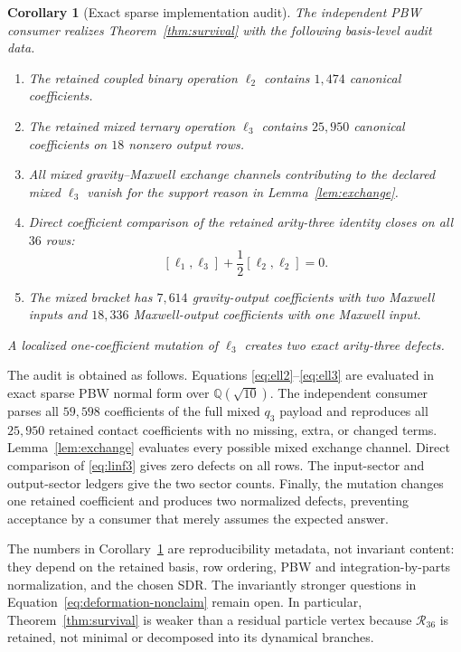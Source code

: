 \documentclass[11pt]{article}
\newtheorem{corollary}[theorem]{Corollary}
\theoremstyle{definition}
\theoremstyle{remark}
\newcommand{\Q}{\mathbb Q}
\newcommand{\cR}{\mathcal R}
\begin{document}
\begin{corollary}[Exact sparse implementation audit]
\label{cor:sparse-audit}
The independent PBW consumer realizes Theorem~\ref{thm:survival} with the
following basis-level audit data.
\begin{enumerate}
\item The retained coupled binary operation $\ell_2$ contains $1{,}474$
canonical coefficients.
\item The retained mixed ternary operation $\ell_3$ contains $25{,}950$
canonical coefficients on $18$ nonzero output rows.
\item All mixed gravity--Maxwell exchange channels contributing to the
declared mixed $\ell_3$ vanish for the support reason in
Lemma~\ref{lem:exchange}.
\item Direct coefficient comparison of the retained arity-three identity
closes on all $36$ rows:
\begin{equation}\label{eq:linf3}
 [\ell_1,\ell_3]+\frac12[\ell_2,\ell_2]=0.
\end{equation}
\item The mixed bracket has $7{,}614$ gravity-output coefficients with two
Maxwell inputs and $18{,}336$ Maxwell-output coefficients with one Maxwell
input.
\end{enumerate}
A localized one-coefficient mutation of $\ell_3$ creates two exact
arity-three defects.
\end{corollary}

The audit is obtained as follows.  Equations
\eqref{eq:ell2}--\eqref{eq:ell3} are evaluated in exact sparse PBW normal form
over $\Q(\sqrt{10})$.  The independent consumer parses all $59{,}598$
coefficients of the full mixed $q_3$ payload and reproduces all $25{,}950$
retained contact coefficients with no missing, extra, or changed terms.
Lemma~\ref{lem:exchange} evaluates every possible mixed exchange channel.
Direct comparison of \eqref{eq:linf3} gives zero defects on all rows.  The
input-sector and output-sector ledgers give the two sector counts.  Finally,
the mutation changes one retained coefficient and produces two normalized
defects, preventing acceptance by a consumer that merely assumes the expected
answer.

The numbers in Corollary~\ref{cor:sparse-audit} are reproducibility metadata,
not invariant content: they depend on the retained basis, row ordering, PBW
and integration-by-parts normalization, and the chosen SDR.  The invariantly
stronger questions in Equation~\eqref{eq:deformation-nonclaim} remain open.
In particular, Theorem~\ref{thm:survival} is weaker than a residual particle
vertex because $\cR_{36}$ is retained, not minimal or decomposed into its
dynamical branches.
\end{document}
